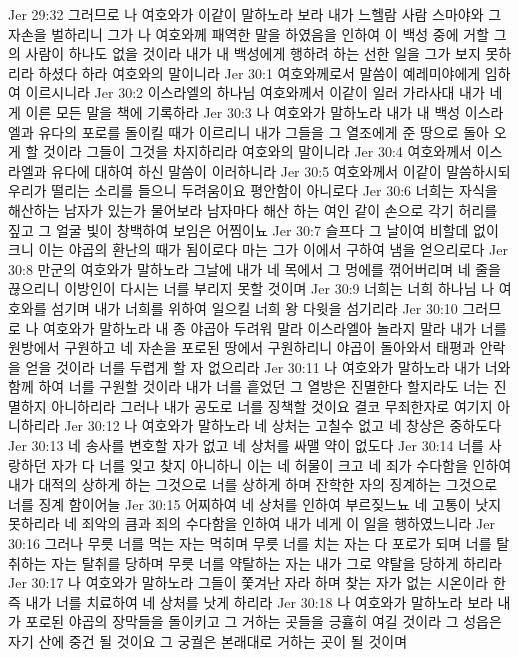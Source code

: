 Jer 29:32  그러므로 나 여호와가 이같이 말하노라 보라 내가 느헬람 사람 스마야와 그 자손을 벌하리니 그가 나 여호와께 패역한 말을 하였음을 인하여 이 백성 중에 거할 그의 사람이 하나도 없을 것이라 내가 내 백성에게 행하려 하는 선한 일을 그가 보지 못하리라 하셨다 하라 여호와의 말이니라
Jer 30:1  여호와께로서 말씀이 예레미야에게 임하여 이르시니라
Jer 30:2  이스라엘의 하나님 여호와께서 이같이 일러 가라사대 내가 네게 이른 모든 말을 책에 기록하라
Jer 30:3  나 여호와가 말하노라 내가 내 백성 이스라엘과 유다의 포로를 돌이킬 때가 이르리니 내가 그들을 그 열조에게 준 땅으로 돌아 오게 할 것이라 그들이 그것을 차지하리라 여호와의 말이니라
Jer 30:4  여호와께서 이스라엘과 유다에 대하여 하신 말씀이 이러하니라
Jer 30:5  여호와께서 이같이 말씀하시되 우리가 떨리는 소리를 들으니 두려움이요 평안함이 아니로다
Jer 30:6  너희는 자식을 해산하는 남자가 있는가 물어보라 남자마다 해산 하는 여인 같이 손으로 각기 허리를 짚고 그 얼굴 빛이 창백하여 보임은 어찜이뇨
Jer 30:7  슬프다 그 날이여 비할데 없이 크니 이는 야곱의 환난의 때가 됨이로다 마는 그가 이에서 구하여 냄을 얻으리로다
Jer 30:8  만군의 여호와가 말하노라 그날에 내가 네 목에서 그 멍에를 꺾어버리며 네 줄을 끊으리니 이방인이 다시는 너를 부리지 못할 것이며
Jer 30:9  너희는 너희 하나님 나 여호와를 섬기며 내가 너희를 위하여 일으킬 너희 왕 다윗을 섬기리라
Jer 30:10  그러므로 나 여호와가 말하노라 내 종 야곱아 두려워 말라 이스라엘아 놀라지 말라 내가 너를 원방에서 구원하고 네 자손을 포로된 땅에서 구원하리니 야곱이 돌아와서 태평과 안락을 얻을 것이라 너를 두렵게 할 자 없으리라
Jer 30:11  나 여호와가 말하노라 내가 너와 함께 하여 너를 구원할 것이라 내가 너를 흩었던 그 열방은 진멸한다 할지라도 너는 진멸하지 아니하리라 그러나 내가 공도로 너를 징책할 것이요 결코 무죄한자로 여기지 아니하리라
Jer 30:12  나 여호와가 말하노라 네 상처는 고칠수 없고 네 창상은 중하도다
Jer 30:13  네 송사를 변호할 자가 없고 네 상처를 싸맬 약이 없도다
Jer 30:14  너를 사랑하던 자가 다 너를 잊고 찾지 아니하니 이는 네 허물이 크고 네 죄가 수다함을 인하여 내가 대적의 상하게 하는 그것으로 너를 상하게 하며 잔학한 자의 징계하는 그것으로 너를 징계 함이어늘
Jer 30:15  어찌하여 네 상처를 인하여 부르짖느뇨 네 고통이 낫지 못하리라 네 죄악의 큼과 죄의 수다함을 인하여 내가 네게 이 일을 행하였느니라
Jer 30:16  그러나 무릇 너를 먹는 자는 먹히며 무릇 너를 치는 자는 다 포로가 되며 너를 탈취하는 자는 탈취를 당하며 무릇 너를 약탈하는 자는 내가 그로 약탈을 당하게 하리라
Jer 30:17  나 여호와가 말하노라 그들이 쫓겨난 자라 하며 찾는 자가 없는 시온이라 한즉 내가 너를 치료하여 네 상처를 낫게 하리라
Jer 30:18  나 여호와가 말하노라 보라 내가 포로된 야곱의 장막들을 돌이키고 그 거하는 곳들을 긍휼히 여길 것이라 그 성읍은 자기 산에 중건 될 것이요 그 궁궐은 본래대로 거하는 곳이 될 것이며
